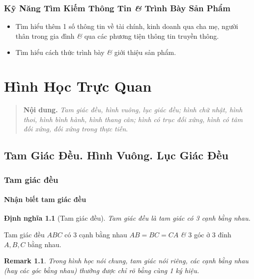 \documentclass[oneside]{book}
\numberwithin{equation}{section}
\newtheorem{dinhnghia}{Định nghĩa}[section]
\newtheorem{remark}{Remark}[section]
\begin{document}
\subsection{Kỹ Năng Tìm Kiếm Thông Tin \textit{\&} Trình Bày Sản Phẩm}

\begin{itemize}
	\item Tìm hiểu thêm 1 số thông tin về tài chính, kinh doanh qua cha mẹ, người thân trong gia đình \textit{\&} qua các phương tiện thông tin truyền thông.
	\item Tìm hiểu cách thức trình bày \textit{\&} giới thiệu sản phẩm.
\end{itemize}


\chapter{Hình Học Trực Quan}

\begin{quotation}
	\textbf{Nội dung.} \textit{Tam giác đều, hình vuông, lục giác đều; hình chữ nhật, hình thoi, hình bình hành, hình thang cân; hình có trục đối xứng, hình có tâm đối xứng, đối xứng trong thực tiễn}.
\end{quotation}

\section{Tam Giác Đều. Hình Vuông. Lục Giác Đều}

\subsection{Tam giác đều}

\subsubsection{Nhận biết tam giác đều}
\begin{dinhnghia}[Tam giác đều]
	\emph{Tam giác đều} là tam giác có 3 cạnh bằng nhau.
\end{dinhnghia}
Tam giác đều $ABC$ có 3 cạnh bằng nhau $AB = BC = CA$ \textit{\&} 3 góc ở 3 đỉnh $A,B,C$ bằng nhau.

\begin{remark}
	Trong hình học nói chung, tam giác nói riêng, các cạnh bằng nhau (hay các góc bằng nhau) thường được chỉ rõ bằng cùng 1 ký hiệu.
\end{remark}
\end{document}
